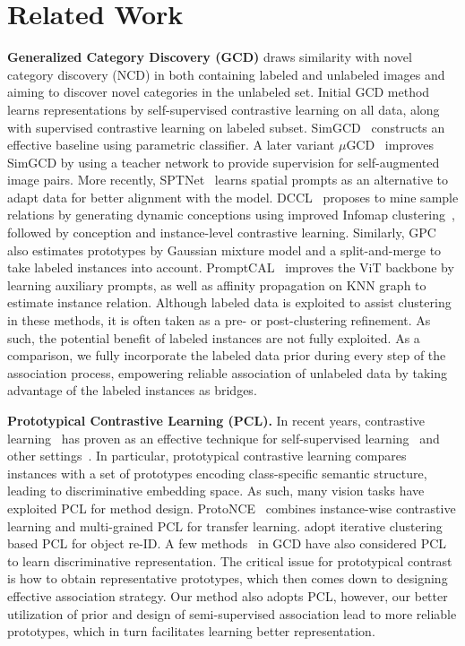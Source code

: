 \section{Related Work}
\textbf{Generalized Category Discovery (GCD)} draws similarity with novel category discovery (NCD) in both containing labeled and unlabeled images and aiming to discover novel categories in the unlabeled set. Initial GCD method~\cite{vaze2022generalized} learns representations by self-supervised contrastive learning on all data, along with supervised contrastive learning on labeled subset. SimGCD~\cite{wen2023parametric} constructs an effective baseline using parametric classifier. A later variant $\mu$GCD~\cite{vaze2023norep} improves SimGCD by using a teacher network to provide supervision for self-augmented image pairs. More recently, SPTNet~\cite{wang2023sptnet} learns spatial prompts as an alternative to adapt data for better alignment with the model. DCCL~\cite{pu2023dynamic} proposes to mine sample relations by generating dynamic conceptions using improved Infomap clustering~\cite{rosvall2008infomap}, followed by conception and instance-level contrastive learning. Similarly, GPC~\cite{zhao2023learning} also estimates prototypes by Gaussian mixture model and a split-and-merge to take labeled instances into account. PromptCAL~\cite{zhang2023promptcal} improves the ViT backbone by learning auxiliary prompts, as well as affinity propagation on KNN graph to estimate instance relation. Although labeled data is exploited to assist clustering in these methods, it is often taken as a pre- or post-clustering refinement. As such, the potential benefit of labeled instances are not fully exploited.  As a comparison, we fully incorporate the labeled data prior during every step of the association process, empowering reliable association of unlabeled data by taking advantage of the labeled instances as bridges. 



\noindent\textbf{Prototypical Contrastive Learning (PCL).}
In recent years, contrastive learning~\cite{Gutmann2010NCE} has proven as an effective technique for self-supervised learning~\cite{wu2018memory, he2020momentum, Chen2020SimCLR, Li2021pcl} and other settings~\cite{Khosla2020SCL, Wang2021ICS, zhao2023learning}. In particular, prototypical contrastive learning compares instances with a set of prototypes encoding class-specific semantic structure, leading to discriminative embedding space. As such, many vision tasks have exploited PCL for method design. ProtoNCE~\cite{Li2021pcl} combines instance-wise contrastive learning and multi-grained PCL for transfer learning. \cite{ge2020self,Wang2021CAP} adopt iterative clustering based PCL for object re-ID. A few methods~\cite{pu2023dynamic, zhao2023learning} in GCD have also considered PCL to learn discriminative representation. The critical issue for prototypical contrast is how to obtain representative prototypes, which then comes down to designing effective association strategy. Our method also adopts PCL, however, our better utilization of prior and design of semi-supervised association lead to more reliable prototypes, which in turn facilitates learning better representation.


